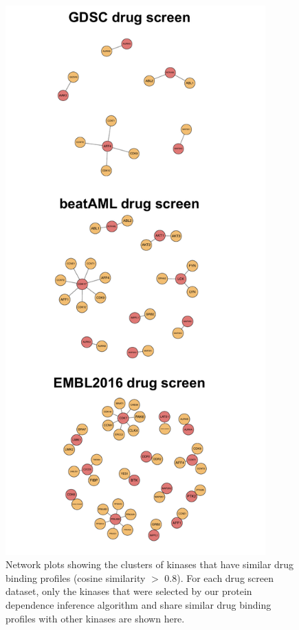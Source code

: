 \documentclass{scrartcl}
\begin{document}
\begin{figure}[h]
    \centering
    \includegraphics[width=10cm]{targetGroup_supp}
    \caption{Network plots showing the clusters of kinases that have similar drug binding profiles (cosine similarity $>$ 0.8). For each drug screen dataset, only the kinases that were selected by our protein dependence inference algorithm and share similar drug binding profiles with other kinases are shown here.}
\end{figure}
\end{document}
